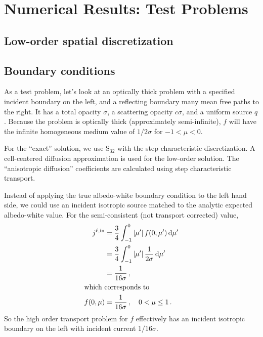 
\chapter{Numerical Results: Test Problems}


\section{Low-order spatial discretization}

\section{Boundary conditions}

As a test problem, let's look at an optically thick problem with a specified
incident boundary on the left, and a reflecting boundary many mean free paths to
the right. It has a total opacity $\sigma$, a scattering opacity $c\sigma$, and
a uniform source $q$. Because the problem is optically thick (approximately
semi-infinite), $f$ will have the infinite homogeneous medium value of
$1/2\sigma$ for $-1 < \mu < 0$.

For the ``exact'' solution, we use S$_{32}$ with the step characteristic
discretization. A cell-centered diffusion approximation is used for
the low-order solution. The ``anisotropic diffusion'' coefficients are
calculated using step characteristic transport.

Instead of applying the true albedo-white boundary condition to the
left hand side, we could use an incident isotropic source matched to the
analytic expected albedo-white value. For the semi-consistent (not transport
corrected) value,
\begin{align*}
  j^{\ell,\mathrm{in}} &= \frac{3}{4} \int_{-1}^{0} \left| \mu' \right| f(0, \mu') \mathop{}\!\mathrm{d}\mu' \\
  &= \frac{3}{4} \int_{-1}^{0} \left| \mu' \right| \frac{1}{2\sigma} \mathop{}\!\mathrm{d}\mu' \\
  &= \frac{1}{16\sigma} \,,
  \\ 
  \intertext{which corresponds to}
  f(0, \mu) &=  \frac{1}{16\sigma} \,,\quad 0 < \mu \le 1\,.
\end{align*}
So the high order transport problem for $f$ effectively has an incident
isotropic boundary on the left with incident current $1/16\sigma$.

